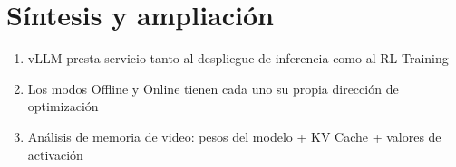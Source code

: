 \section{Síntesis y ampliación}
\begin{enumerate}
  \item vLLM presta servicio tanto al despliegue de inferencia como al RL Training
  \item Los modos Offline y Online tienen cada uno su propia dirección de optimización
  \item Análisis de memoria de video: pesos del modelo + KV Cache + valores de activación
\end{enumerate}

